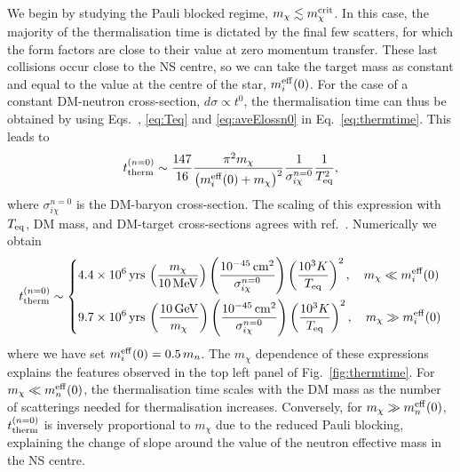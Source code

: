 We begin by studying the Pauli blocked regime, $m_\chi \lesssim m_\chi^{\rm crit}$. 
In this case, the majority of the thermalisation time is dictated by the final few scatters, for which the form factors are close to their value at zero momentum transfer.  These last collisions occur close to the NS centre, so we can take the target mass as constant and equal to the value at the centre of the star, $m_i^{\rm eff}(0)$. For the case of a constant DM-neutron cross-section, $d\sigma \propto t^0$, the thermalisation time can thus be obtained by using  Eqs.~, \ref{eq:Teq} and \ref{eq:aveElossn0} in Eq.~\ref{eq:thermtime}. This leads to
%
\footnotesize
\begin{equation}
  t_{\rm therm}^{(n=0)} \sim   \frac{147}{16 }\frac{\pi^2 m_\chi}{ \left(m_i^{\rm eff}(0) + m_\chi\right)^2}\frac{1}{\sigma_{i\chi}^{n=0}}\frac{1}{T_{\rm eq}^2}, 
  \label{eq:thermtimen0}
\end{equation} 
\normalsize
%
where $\sigma_{i\chi}^{n=0}$ is the DM-baryon cross-section. 
The scaling of this expression with $T_{\rm eq}$, DM mass, and DM-target cross-sections 
agrees with ref.~\cite{Bertoni:2013bsa_dec_DarkMatterThermalization}. 
Numerically we obtain
\footnotesize
\begin{equation}
  t_{\rm therm}^{(n=0)} \sim \begin{dcases}
    4.4\times 10^{6}{\rm \,yrs} \, \left(\frac{m_\chi}{10{\rm \,MeV}}\right)\left(\frac{10^{-45}{\rm \,cm}^2}{\sigma_{i\chi}^{n=0}}\right)\left(\frac{10^3K}{T_{\rm eq}}\right)^{2},\quad m_\chi \ll m_i^{\rm eff}(0)\\
    9.7\times 10^{6}{\rm \,yrs} \, \left(\frac{10{\rm \,GeV}}{m_\chi}\right)\left(\frac{10^{-45}{\rm \,cm}^2}{\sigma_{i\chi}^{n=0}}\right)\left(\frac{10^3K}{T_{\rm eq}}\right)^{2},\quad m_\chi \gg m_i^{\rm eff}(0)
  \end{dcases} \label{eq:t_therm_0}
\end{equation}
\normalsize
%
where we have set $m_i^{\rm eff}(0) = 0.5\,m_n$. 
The $m_\chi$ dependence of these expressions explains the features observed in the top left panel of Fig.~\ref{fig:thermtime}. For $m_\chi \ll m_n^{\rm eff}(0)$, the thermalisation time scales with the DM mass as the number of scatterings needed for thermalisation increases. Conversely, for $m_\chi \gg m_n^{\rm eff}(0)$, $t_{\rm therm}^{(n=0)}$ is inversely proportional to $m_\chi$ due to the reduced Pauli blocking, explaining the change of slope around the value of the neutron effective mass in the NS centre. 




